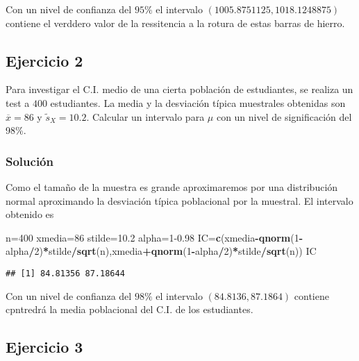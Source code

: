 \documentclass[
]{article}
\newenvironment{Shaded}{\begin{snugshade}}{\end{snugshade}}
\newcommand{\DecValTok}[1]{\textcolor[rgb]{0.00,0.00,0.81}{#1}}
\newcommand{\FloatTok}[1]{\textcolor[rgb]{0.00,0.00,0.81}{#1}}
\newcommand{\KeywordTok}[1]{\textcolor[rgb]{0.13,0.29,0.53}{\textbf{#1}}}
\newcommand{\NormalTok}[1]{#1}
\newcommand{\OperatorTok}[1]{\textcolor[rgb]{0.81,0.36,0.00}{\textbf{#1}}}
\begin{document}
Con un nivel de confianza del \(95\%\) el intervalo
\((1005.8751125, 1018.1248875)\) contiene el verddero valor de la
ressitencia a la rotura de estas barras de hierro.

\hypertarget{ejercicio-2}{%
\subsection{Ejercicio 2}\label{ejercicio-2}}

Para investigar el C.I. medio de una cierta población de estudiantes, se
realiza un test a \(400\) estudiantes. La media y la desviación típica
muestrales obtenidas son \(\overline{x}=86\) y \(\tilde{s}_{X}=10.2\).
Calcular un intervalo para \(\mu\) con un nivel de significación del
98\%.

\hypertarget{soluciuxf3n-1}{%
\subsubsection{Solución}\label{soluciuxf3n-1}}

Como el tamaño de la muestra es grande aproximaremos por una
distribución normal aproximando la desviación típica poblacional por la
muestral. El intervalo obtenido es

\begin{Shaded}
\begin{Highlighting}[]
\NormalTok{n=}\DecValTok{400}
\NormalTok{xmedia=}\DecValTok{86}
\NormalTok{stilde=}\FloatTok{10.2}
\NormalTok{alpha=}\DecValTok{1}\FloatTok{{-}0.98}
\NormalTok{IC=}\KeywordTok{c}\NormalTok{(xmedia}\OperatorTok{{-}}\KeywordTok{qnorm}\NormalTok{(}\DecValTok{1}\OperatorTok{{-}}\NormalTok{alpha}\OperatorTok{/}\DecValTok{2}\NormalTok{)}\OperatorTok{*}\NormalTok{stilde}\OperatorTok{/}\KeywordTok{sqrt}\NormalTok{(n),xmedia}\OperatorTok{+}\KeywordTok{qnorm}\NormalTok{(}\DecValTok{1}\OperatorTok{{-}}\NormalTok{alpha}\OperatorTok{/}\DecValTok{2}\NormalTok{)}\OperatorTok{*}\NormalTok{stilde}\OperatorTok{/}\KeywordTok{sqrt}\NormalTok{(n))}
\NormalTok{IC}
\end{Highlighting}
\end{Shaded}

\begin{verbatim}
## [1] 84.81356 87.18644
\end{verbatim}

Con un nivel de confianza del \(98\%\) el intervalo
\((84.8136, 87.1864)\) contiene cpntredrá la media poblacional del C.I.
de los estudiantes.

\hypertarget{ejercicio-3}{%
\subsection{Ejercicio 3}\label{ejercicio-3}}
\end{document}
